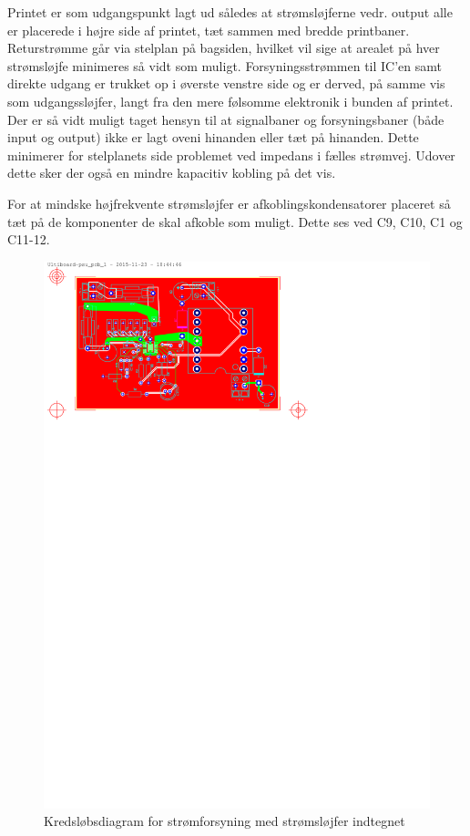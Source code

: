 Printet er som udgangspunkt lagt ud således at strømsløjferne vedr. output alle er placerede i højre side af printet, tæt sammen med bredde printbaner. 
Returstrømme går via stelplan på bagsiden, hvilket vil sige at arealet på hver strømsløjfe minimeres så vidt som muligt.
Forsyningsstrømmen til IC'en samt direkte udgang er trukket op i øverste venstre side og er derved, på samme vis som udgangssløjfer, langt fra den mere følsomme elektronik i bunden af printet. 
Der er så vidt muligt taget hensyn til at signalbaner og forsyningsbaner (både input og output) ikke er lagt oveni hinanden eller tæt på hinanden. 
Dette minimerer for stelplanets side problemet ved impedans i fælles strømvej. 
Udover dette sker der også en mindre kapacitiv kobling på det vis.

For at mindske højfrekvente strømsløjfer er afkoblingskondensatorer placeret så tæt på de komponenter de skal afkoble som muligt. Dette ses ved C9, C10, C1 og C11-12.

\clearpage

\begin{landscape}
\begin{figure}[h]
\centering
\includegraphics[height=\textwidth-2.5cm, clip=true, trim=50 615 234 25]{../fig/diagrammer/bil/psu_pcb_twoside}
\caption{Kredsløbsdiagram for strømforsyning med strømsløjfer indtegnet}
\label{fig:psu_pcb}
\end{figure}
\end{landscape}


